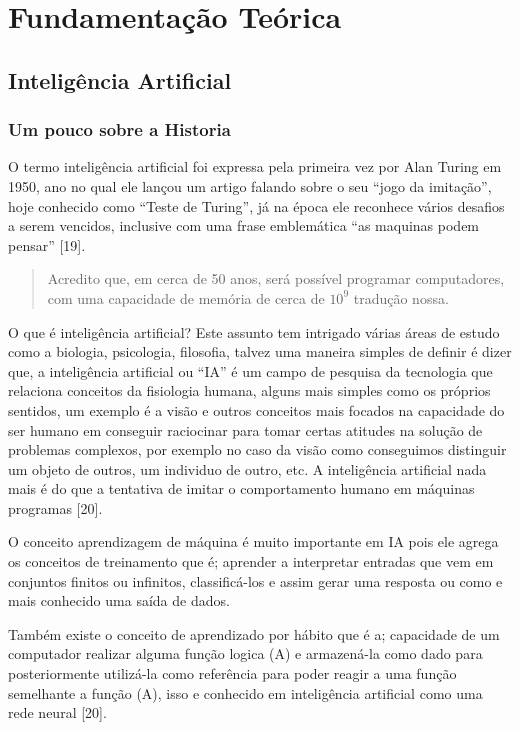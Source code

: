 \chapter{Fundamentação Teórica}\label{cap:fundTeo}

\section{Inteligência Artificial}

\subsection{Um pouco sobre a Historia}
O termo inteligência artificial foi expressa pela primeira vez por Alan Turing em 1950, ano no qual ele lançou um artigo falando sobre o seu “jogo da imitação”, hoje conhecido como “Teste de Turing”, já na época ele reconhece vários desafios a serem vencidos, inclusive com uma frase emblemática “as maquinas podem pensar” [19].
 \begin{quotation}
    \footnotesize Acredito que, em cerca de 50 anos, será possível programar computadores, com uma capacidade de memória de cerca de \(10^9\) \cite{alanT} tradução nossa.
 \end{quotation}
O que é inteligência artificial? Este assunto tem intrigado várias áreas de estudo como a biologia, psicologia, filosofia, talvez uma maneira simples de definir é dizer que, a  inteligência artificial ou “IA” é um campo de pesquisa da tecnologia que relaciona conceitos da fisiologia humana, alguns mais simples como os próprios sentidos,  um exemplo é a visão e outros conceitos mais focados na capacidade do ser humano em conseguir raciocinar para tomar certas atitudes na solução de problemas complexos, por exemplo no caso da visão como conseguimos distinguir um objeto de outros, um individuo de outro, etc. A inteligência artificial nada mais é do que a tentativa de imitar o comportamento humano em máquinas programas [20].


O conceito aprendizagem de máquina é muito importante em IA pois ele agrega os conceitos de treinamento que é; aprender a interpretar entradas que vem em conjuntos finitos ou infinitos, classificá-los e assim gerar uma resposta ou como e mais conhecido uma saída de dados. 

Também existe o conceito de aprendizado por hábito que é a; capacidade de um computador realizar alguma função logica (A) e armazená-la como dado para posteriormente utilizá-la como referência para poder reagir a uma função semelhante a função (A), isso e conhecido em inteligência artificial como uma rede neural [20].


